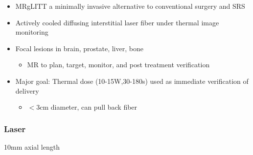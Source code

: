 \documentclass{beamer}
\newcommand{\picdir}{pdffig}
\begin{document}
{\begin{minipage}{.51\textwidth}
\begin{itemize}
\item  MRgLITT
a minimally invasive alternative to
conventional surgery and SRS
\item Actively cooled diffusing interstitial laser fiber
under thermal image monitoring
\item Focal lesions in brain, prostate, liver, bone
   \begin{itemize} \scriptsize
     \item \alert{MR to plan, target, monitor, and post treatment
verification}
   \end{itemize}
\item \alert {Major goal:} Thermal dose (10-15W,30-180s)
      used as immediate verification  of delivery
   \begin{itemize} \scriptsize
      \item $<$3cm diameter, can pull back fiber
   \end{itemize}
\end{itemize}
\end{minipage}
}
\begin{frame}
\frametitle{Laser}

10mm axial length \\

\end{frame}
\end{document}
